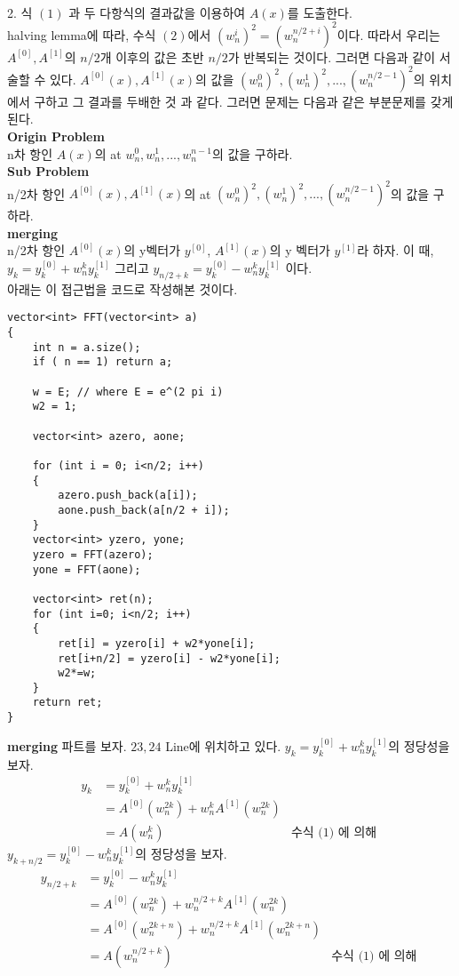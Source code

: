 \documentclass{article}
\begin{document}
\\
2. 식 $(1)$ 과 두 다항식의 결과값을 이용하여 $A(x)$를 도출한다. 
\\
halving lemma에 따라, 수식 $(2)$에서 $(w_n^i)^2 = (w_n^{n/2+i})^2$이다. 
따라서 우리는 $A^{[0]}, A^{[1]}$의 $n/2$개 이후의 값은 초반 $n/2$가 반복되는 것이다.
그러면 다음과 같이 서술할 수 있다. $A^{[0]}(x), A^{[1]}(x)$의 값을 $(w_n^0)^2, (w_n^1)^2, ... , (w_n^{n/2-1})^2$의 위치에서 구하고 
그 결과를 두배한 것 과 같다. 그러면 문제는 다음과 같은 부분문제를 갖게된다. 
\\
\textbf{Origin Problem}
\\
n차 항인 $A(x)$의 at $w_n^0, w_n^1, ... , w_n^{n-1}$의 값을 구하라. 
\\
\textbf{Sub Problem}
\\
n/2차 항인 $A^{[0]}(x), A^{[1]}(x)$의 at $(w_n^0)^2, (w_n^1)^2, ... , (w_n^{n/2-1})^2$의 값을 구하라.
\\
\textbf{merging}
\\
n/2차 항인 $A^{[0]}(x)$의 y벡터가 $y^{[0]}$, $A^{[1]}(x)$의 y 벡터가 $y^{[1]}$라 하자. 
이 때, $y_k = y_k^{[0]} + w_n^k y_k^{[1]}$ 그리고 $y_{n/2+k} = y_k^{[0]} - w_n^k y_k^{[1]}$ 이다. 
\pagebreak
\\
아래는 이 접근법을 코드로 작성해본 것이다. 
\begin{lstlisting}
vector<int> FFT(vector<int> a)
{
    int n = a.size();
    if ( n == 1) return a;

    w = E; // where E = e^(2 pi i)
    w2 = 1;

    vector<int> azero, aone;

    for (int i = 0; i<n/2; i++)
    {
        azero.push_back(a[i]);
        aone.push_back(a[n/2 + i]);
    }
    vector<int> yzero, yone;
    yzero = FFT(azero);
    yone = FFT(aone);

    vector<int> ret(n);
    for (int i=0; i<n/2; i++)
    {
        ret[i] = yzero[i] + w2*yone[i];
        ret[i+n/2] = yzero[i] - w2*yone[i];
        w2*=w;
    }
    return ret;
}
\end{lstlisting}
\textbf{merging} 파트를 보자. $23, 24$ Line에 위치하고 있다. 
$y_k = y_k^{[0]} + w_n^k y_k^{[1]}$의 정당성을 보자. 
\begin{align*}
    y_k &= y_k^{[0]} + w_n^k y_k^{[1]}\\
    &=A^{[0]}(w_n^{2k}) + w_n^kA^{[1]}(w_n^{2k})\\
    &=A(w_n^k) &\text{수식 (1) 에 의해 }
\end{align*}
$y_{k+n/2} = y_k^{[0]} - w_n^k y_k^{[1]}$의 정당성을 보자. 
\begin{align*}
    y_{n/2+k} &= y_k^{[0]} - w_n^k y_k^{[1]}\\
    &=A^{[0]}(w_n^{2k}) + w_n^{n/2+k}A^{[1]}(w_n^{2k})\\
    &=A^{[0]}(w_n^{2k+n}) + w_n^{n/2+k}A^{[1]}(w_n^{2k+n})\\
    &=A(w_n^{n/2+k}) &\text{수식 (1) 에 의해 }
\end{align*}
\pagebreak
\end{document}
